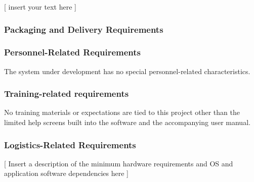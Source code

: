 \documentclass[twoside,letterpaper]{article}
\begin{document}
[ insert your text here ] %

\subsubsection{Packaging and Delivery Requirements}


\subsubsection{Personnel-Related Requirements}
The system under development has no special personnel-related
characteristics.

\subsubsection{Training-related requirements}

No training materials or expectations are tied to this project other
than the limited help screens built into the software and the
accompanying user manual.

\subsubsection{Logistics-Related Requirements}

[ Insert a description of the minimum hardware requirements and OS and
application software dependencies here ] %
\end{document}

